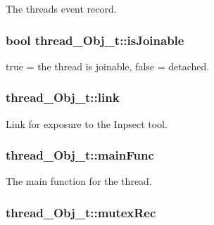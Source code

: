 The thread\textquotesingle{}s event record. 

\subsubsection[{\texorpdfstring{is\+Joinable}{isJoinable}}]{\setlength{\rightskip}{0pt plus 5cm}bool thread\+\_\+\+Obj\+\_\+t\+::is\+Joinable}\hypertarget{structthread___obj__t_ae66955c806e53ee92fbba7f8f58186e7}{}\label{structthread___obj__t_ae66955c806e53ee92fbba7f8f58186e7}


true = the thread is joinable, false = detached. 

\subsubsection[{\texorpdfstring{link}{link}}]{ thread\+\_\+\+Obj\+\_\+t\+::link}\hypertarget{structthread___obj__t_a713b7ec59e7c1c0d8a933ce49ea43632}{}\label{structthread___obj__t_a713b7ec59e7c1c0d8a933ce49ea43632}


Link for exposure to the Inpsect tool. 

\subsubsection[{\texorpdfstring{main\+Func}{mainFunc}}]{ thread\+\_\+\+Obj\+\_\+t\+::main\+Func}\hypertarget{structthread___obj__t_a5a1111c537829992f6dd41e050d23346}{}\label{structthread___obj__t_a5a1111c537829992f6dd41e050d23346}


The main function for the thread. 

\subsubsection[{\texorpdfstring{mutex\+Rec}{mutexRec}}]{ thread\+\_\+\+Obj\+\_\+t\+::mutex\+Rec}\hypertarget{structthread___obj__t_a312844fab77f87e62e6ed01cb03af0f2}{}\label{structthread___obj__t_a312844fab77f87e62e6ed01cb03af0f2}



